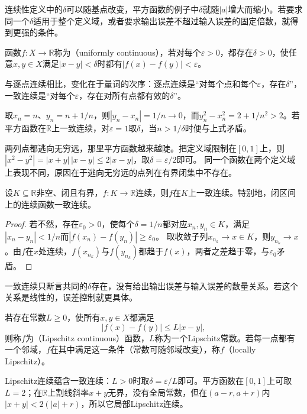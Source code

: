 连续性定义中的$\delta$可以随基点改变，平方函数的例子中$\delta$就随$|a|$增大而缩小。若要求同一个$\delta$适用于整个定义域，或者要求输出误差不超过输入误差的固定倍数，就得到更强的条件。
\begin{definition}[一致连续]
\label{def:analysis-uniform-continuity}
函数$f:X\to\mathbb R$称为（uniformly continuous），若对每个$\varepsilon>0$，都存在$\delta>0$，使任意$x,y\in X$满足$|x-y|<\delta$时都有$|f(x)-f(y)|<\varepsilon$。
\end{definition}
与逐点连续相比，变化在于量词的次序：逐点连续是“对每个点和每个$\varepsilon$，存在$\delta$”，一致连续是“对每个$\varepsilon$，存在对所有点都有效的$\delta$”。
\begin{example}[平方函数在实轴上不一致连续]
\label{ex:analysis-square-not-uniformly-continuous}
取$x_n=n$、$y_n=n+1/n$，则$|y_n-x_n|=1/n\to0$，而$y_n^2-x_n^2=2+1/n^2>2$。若平方函数在$\mathbb R$上一致连续，对$\varepsilon=1$取$\delta$，当$n>1/\delta$时便与上式矛盾。
\end{example}
两列点都逃向无穷远，那里平方函数越来越陡。把定义域限制在$[0,1]$上，则$|x^2-y^2|=|x+y|\,|x-y|\leq2|x-y|$，取$\delta=\varepsilon/2$即可。
同一个函数在两个定义域上表现不同，原因在于逃向无穷远的点列在有界闭集中不存在。
\begin{theorem}[一致连续性定理]
\label{thm:analysis-uniform-continuity}
设$K\subseteq\mathbb R$非空、闭且有界，$f:K\to\mathbb R$连续，则$f$在$K$上一致连续。特别地，闭区间上的连续函数一致连续。
\end{theorem}
\begin{proof}
若不然，存在$\varepsilon_0>0$，使每个$\delta=1/n$都对应$x_n,y_n\in K$，满足$|x_n-y_n|<1/n$而$|f(x_n)-f(y_n)|\geq\varepsilon_0$。
取收敛子列$x_{n_k}\to x\in K$，则$y_{n_k}\to x$。由$f$在$x$处连续，$f(x_{n_k})$与$f(y_{n_k})$都趋于$f(x)$，两者之差趋于零，与$\varepsilon_0$矛盾。
\end{proof}

一致连续只断言共同的$\delta$存在，没有给出输出误差与输入误差的数量关系。若这个关系是线性的，误差控制就更具体。
\begin{definition}[Lipschitz连续]
\label{def:analysis-lipschitz-continuity}
若存在常数$L\geq0$，使所有$x,y\in X$都满足
\begin{equation}
 |f(x)-f(y)|\leq L|x-y|,
 \label{eq:analysis-lipschitz-condition}
\end{equation}
则称$f$为（Lipschitz continuous）函数，$L$称为一个Lipschitz常数。若每一点都有一个邻域，$f$在其中满足这一条件（常数可随邻域改变），称$f$（locally Lipschitz）。
\end{definition}
Lipschitz连续蕴含一致连续：$L>0$时取$\delta=\varepsilon/L$即可。平方函数在$[0,1]$上可取$L=2$；在$\mathbb R$上割线斜率$x+y$无界，没有全局常数，但在$(a-r,a+r)$内$|x+y|<2(|a|+r)$，所以它局部Lipschitz连续。

